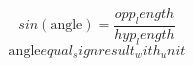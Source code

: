 \[sin(\text{{{angle}}})=\frac{{{opp_length}}}{{{hyp_length}}}\]
\[\text{{{angle}}}{equal_sign}{result_with_unit}\]
